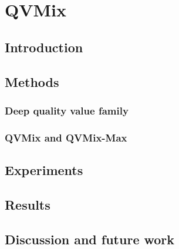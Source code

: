 \chapter{QVMix}\label{ch:qvmix}
\section{Introduction}
\section{Methods}
\subsection{Deep quality value family}
\subsection{QVMix and QVMix-Max}
\section{Experiments}
\section{Results}
\section{Discussion and future work}

